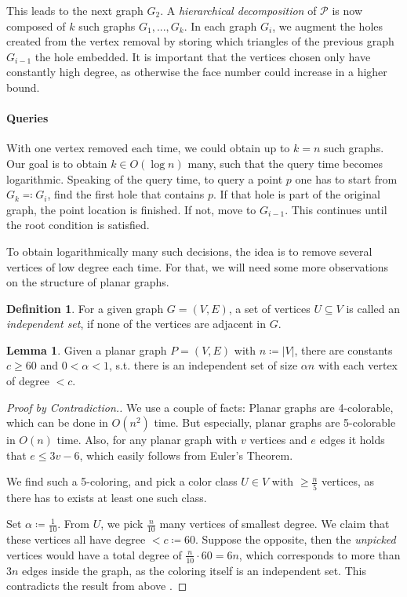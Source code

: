 \documentclass[10pt,fleqn]{article}
\theoremstyle{definition}
\newtheorem{definition}{Definition}
\newtheorem{lemma}{Lemma}
\theoremstyle{remark}
\begin{document}
This leads to the next graph \(G_2\). A \emph{hierarchical decomposition} of \(\mathcal{P}\) is now composed of \(k\) such graphs \(G_1, ..., G_k\). In each graph \(G_i\), we augment the holes created from the vertex removal by storing which triangles of the previous graph \(G_{i-1}\) the hole embedded. It is important that the vertices chosen only have constantly high degree, as otherwise the face number could increase in a higher bound.

\paragraph{Queries} With one vertex removed each time, we could obtain up to \(k = n\) such graphs. Our goal is to obtain \(k \in O(\log{n})\) many, such that the query time becomes logarithmic. Speaking of the query time, to query a point \(p\) one has to start from \(G_k \eqqcolon G_i\), find the first hole that contains \(p\). If that hole is part of the original graph, the point location is finished. If not, move to \(G_{i-1}\). This continues until the root condition is satisfied.

To obtain logarithmically many such decisions, the idea is to remove several vertices of low degree each time. For that, we will need some more observations on the structure of planar graphs.

\begin{definition}
    For a given graph \(G = (V, E)\), a set of vertices \(U \subseteq V\) is called an \emph{independent set}, if none of the vertices are adjacent in \(G\).
\end{definition}


\begin{lemma}
    Given a planar graph \(P = (V, E)\) with \(n \coloneqq |V|\), there are constants \(c \geq 60\) and \(0 < \alpha < 1\), s.t. there is an independent set of size \(\alpha n\) with each vertex of degree \(< c\).
\end{lemma}

\begin{proof}[Proof by Contradiction.]
    We use a couple of facts: Planar graphs are 4-colorable, which can be done in \(O(n^2)\) time. But especially, planar graphs are 5-colorable in \(O(n)\) time. Also, for any planar graph with \(v\) vertices and \(e\) edges it holds that \(e \leq 3v - 6\), which easily follows from Euler's Theorem.
    
    We find such a 5-coloring, and pick a color class \(U \in V\) with \(\geq \frac{n}{5}\) vertices, as there has to exists at least one such class.

    Set \(\alpha \coloneqq \frac{1}{10}\). From \(U\), we pick \(\frac{n}{10}\) many vertices of smallest degree. We claim that these vertices all have degree \(< c \coloneqq 60\). Suppose the opposite, then the \emph{unpicked} vertices would have a total degree of \(\frac{n}{10} \cdot 60 = 6n\), which corresponds to more than \(3n\) edges inside the graph, as the coloring itself is an independent set. This contradicts the result from above \lightning.
\end{proof}
\end{document}
